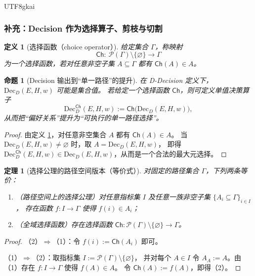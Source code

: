 \documentclass[12pt]{article}
\newtheorem{definition}{定义}[section]
\newtheorem{theorem}{定理}[section]
\newtheorem{proposition}{命题}[section]
\begin{document}
\begin{CJK*}{UTF8}{gkai}
\subsubsection*{补充：Decision 作为选择算子、剪枝与切割}

\begin{definition}[选择函数（choice operator）]\label{def:choice-operator}
给定集合 $\Gamma$，称映射
\[
  \mathsf{Ch}:\ \mathcal{P}(\Gamma)\setminus\{\varnothing\}\longrightarrow \Gamma
\]
为一个选择函数，若对任意非空子集 $A\subseteq \Gamma$ 都有
$\mathsf{Ch}(A)\in A$。
\end{definition}

\begin{proposition}[Decision 输出到“单一路径”的提升]\label{prop:decision-choice}
在 D-Decision 定义下，$\mathrm{Dec}_D(E,H,w)$ 可能是集合值。
若给定一个选择函数 $\mathsf{Ch}$，则可定义单值决策算子
\[
  \mathrm{Dec}_D^{\mathsf{Ch}}(E,H,w):=\mathsf{Ch}\bigl(\mathrm{Dec}_D(E,H,w)\bigr),
\]
从而把“偏好关系”提升为“可执行的单一路径选择”。
\end{proposition}

\begin{proof}
由定义 \ref{def:choice-operator}，对任意非空集合 $A$ 都有 $\mathsf{Ch}(A)\in A$。
当 $\mathrm{Dec}_D(E,H,w)\ne\varnothing$ 时，取 $A=\mathrm{Dec}_D(E,H,w)$，
即得 $\mathrm{Dec}_D^{\mathsf{Ch}}(E,H,w)\in \mathrm{Dec}_D(E,H,w)$，从而是一个合法的最大元选择。
\end{proof}

\begin{theorem}[选择公理的路径空间版本（等价式）]\label{thm:ac-path}
对固定的路径集合 $\Gamma$，下列两条等价：
\begin{enumerate}
  \item （路径空间上的选择公理）对任意指标集 $I$ 及任意一族非空子集 $\{A_i\subseteq\Gamma\}_{i\in I}$，
        存在函数 $f:I\to\Gamma$ 使得 $f(i)\in A_i$；
  \item （全域选择函数）存在选择函数 $\mathsf{Ch}:\mathcal{P}(\Gamma)\setminus\{\varnothing\}\to\Gamma$。
\end{enumerate}
\end{theorem}

\begin{proof}
（2）$\Rightarrow$（1）：令 $f(i):=\mathsf{Ch}(A_i)$ 即可。

（1）$\Rightarrow$（2）：取指标集 $I:=\mathcal{P}(\Gamma)\setminus\{\varnothing\}$，
并对每个 $A\in I$ 令 $A_A:=A$。由（1）存在 $f:I\to\Gamma$ 使得 $f(A)\in A$。
令 $\mathsf{Ch}(A):=f(A)$，即得（2）。
\end{proof}


\end{CJK*}
\end{document}
